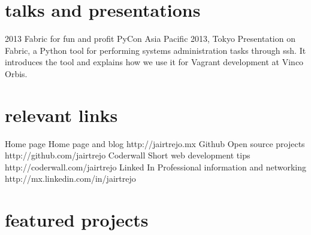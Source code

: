 \documentclass[]{friggeri-cv} %
\begin{document}

\section{talks and presentations}

\begin{entrylist}
\entry
{2013}
{Fabric for fun and profit}
{PyCon Asia Pacific 2013, Tokyo}
{Presentation on Fabric, a Python tool for performing systems administration tasks through ssh. It introduces the tool and explains how we use it for Vagrant development at Vinco Orbis.}
\end{entrylist}


\section{relevant links}

\begin{entrylist}
\entry
{Home page}
{Home page and blog}
{}
{http://jairtrejo.mx}
\entry
{Github}
{Open source projects}
{}
{http://github.com/jairtrejo}
\entry
{Coderwall}
{Short web development tips}
{}
{http://coderwall.com/jairtrejo}
\entry
{Linked In}
{Professional information and networking}
{}
{http://mx.linkedin.com/in/jairtrejo}
\end{entrylist}


\section{featured projects}
\end{document}
